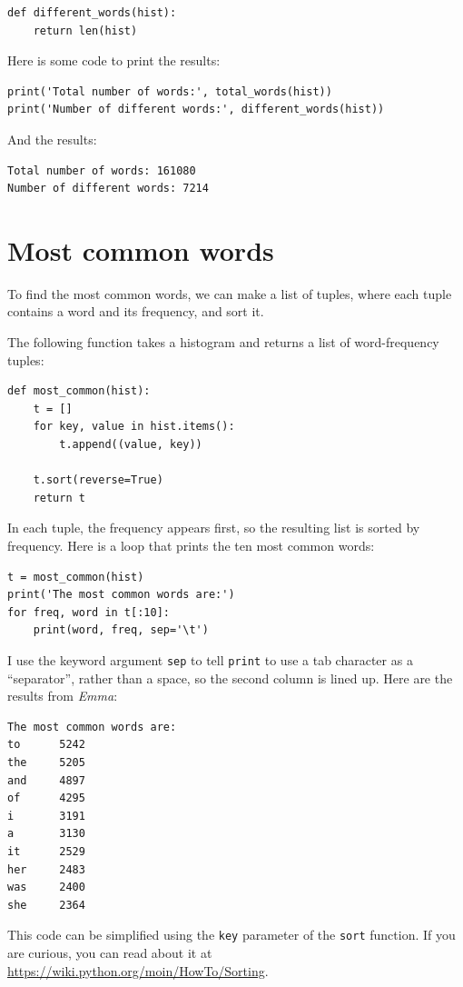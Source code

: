 \documentclass[10pt]{book}
\begin{document}
\begin{verbatim}
def different_words(hist):
    return len(hist)
\end{verbatim}
%
Here is some code to print the results:

\begin{verbatim}
print('Total number of words:', total_words(hist))
print('Number of different words:', different_words(hist))
\end{verbatim}
%
And the results:

\begin{verbatim}
Total number of words: 161080
Number of different words: 7214
\end{verbatim}
%

\section{Most common words}

To find the most common words, we can make a list of tuples,
where each tuple contains a word and its frequency,
and sort it.

The following function takes a histogram and returns a list of
word-frequency tuples:

\begin{verbatim}
def most_common(hist):
    t = []
    for key, value in hist.items():
        t.append((value, key))

    t.sort(reverse=True)
    return t
\end{verbatim}

In each tuple, the frequency appears first, so the resulting list is
sorted by frequency.  Here is a loop that prints the ten most common
words:

\begin{verbatim}
t = most_common(hist)
print('The most common words are:')
for freq, word in t[:10]:
    print(word, freq, sep='\t')
\end{verbatim}
%
I use the keyword argument {\tt sep} to tell {\tt print} to use a tab
character as a ``separator'', rather than a space, so the second
column is lined up.  Here are the results from {\em Emma}:

\begin{verbatim}
The most common words are:
to      5242
the     5205
and     4897
of      4295
i       3191
a       3130
it      2529
her     2483
was     2400
she     2364
\end{verbatim}
%
This code can be simplified using the {\tt key} parameter of
the {\tt sort} function.  If you are curious, you can read about it
at \url{https://wiki.python.org/moin/HowTo/Sorting}.
\end{document}
